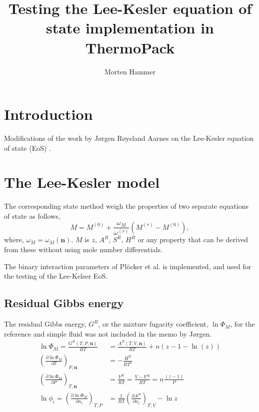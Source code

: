 \documentclass[english]{../thermomemo/thermomemo}
\title{Testing the Lee-Kesler equation of state implementation in ThermoPack}
\author{Morten Hammer}
\numberwithin{equation}{section}
\newcommand*{\pder}[2]{\left(\frac{\partial #1}{\partial #2}\right)}
\begin{document}
\frontmatter

\tableofcontents

\section{Introduction}
Modifications of the work by J\o rgen R\o ysland Aarnes on the
Lee-Kesler equation of state (EoS) \cite{LK}. 

\section{The Lee-Kesler model}
The corresponding state method weigh the properties of two separate
equations of state as follows,
\begin{equation}
\label{eq:LK_main}
M = M^{(0)} + \frac{\omega_M}{\omega^{(r)}}(M^{(r)} - M^{(0)}),
\end{equation}
where, $\omega_M=\omega_M(\textbf{n})$. $M$ is $z$, $A^R$, $S^R$,
$H^R$ or any property that can be derived from these without using
mole number differentials.

The binary interaction parameters of Plöcker et al. \cite{PKP} is
implemented, and used for the testing of the Lee-Kelser EoS.

\subsection{Residual Gibbs energy}
The residual Gibbs energy, $G^R$, or the mixture fugacity coefficient,
$\ln \Phi_M$, for the reference and simple fluid was not included in
the memo by J{\o}rgen.
\begin{align}
\label{def:G^R(T,P,n)}
\ln \Phi_M = \frac{G^R(T,P,\textbf{n})}{RT} &= \frac{A^R(T,V,\textbf{n})}{RT} + n\left(z - 1 -
  \ln(z)\right)\\
\pder{\ln \Phi_M}{T}_{P,\textbf{n}} &= -\frac{H^R}{RT^2}\\
\pder{\ln \Phi_M}{P}_{T,\textbf{n}} &= \frac{V^R}{RT} = \frac{V -
  V^{ig}}{RT} = n\frac{\left(z-1\right)}{P}\\
  \ln \phi_i = \pder{\ln \Phi_M}{n_i}_{T,P} & = \frac{1}{RT} \pder{A^R}{n_i}_{T,V} - \ln z\\
\end{align}
\end{document}

